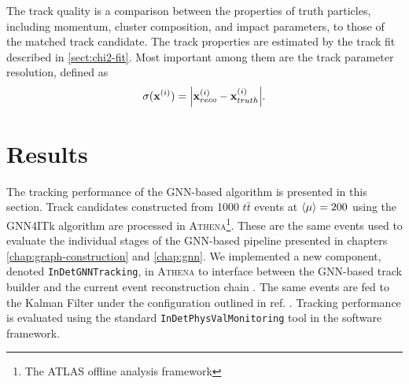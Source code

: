 The track quality is a comparison between the properties of truth particles, including momentum, cluster composition, and impact parameters, to those of the matched track candidate. 
The track properties are estimated by the track fit described in \ref{sect:chi2-fit}. 
Most important among them are the track parameter resolution, defined as
\begin{equation}
\label{eq:track-performance:11}
    \sigma(\mathbf{x}^{(i)}) = \abs{ \mathbf{x}^{(i)}_{reco} - \mathbf{x}^{(i)}_{truth}  }.
\end{equation}

\section{Results}
\label{sect:track-performance}

The tracking performance of the GNN-based algorithm is presented in this section. 
Track candidates constructed from 1000 $t\bar{t}$ events at $\expval{\mu}=200$ using the GNN4ITk algorithm are processed in \textsc{Athena}\footnote{The ATLAS offline analysis framework}. 
These are the same events used to evaluate the individual stages of the GNN-based pipeline presented in chapters \ref{chap:graph-construction} and \ref{chap:gnn}. 
We implemented a new component, denoted \texttt{InDetGNNTracking}, in \textsc{Athena} to interface between the GNN-based track builder and the current event reconstruction chain \cite{atlas_collaboration_2021_4772550}.
The same events are fed to the Kalman Filter under the configuration outlined in ref. \cite{Aad_2025}.
Tracking performance is evaluated using the standard \texttt{InDetPhysValMonitoring} tool in the software framework.


